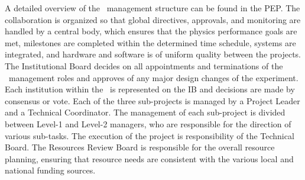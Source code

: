 A detailed overview of the \GADMC\ management structure can be found in the PEP. The collaboration is organized so that global directives, approvals, and monitoring are handled by a central body, which ensures that the physics performance goals are met, milestones are completed within the determined time schedule, systems are integrated, and hardware and software is of uniform quality between the projects. The Institutional Board decides on all appointments and terminations of the \GADMC\ management roles and approves of any major design changes of the experiment. Each institution within the \GADMC\ is represented on the IB and decisions are made by consensus or vote. Each of the three sub-projects is managed by a Project Leader and a Technical Coordinator. The management of each sub-project is divided between Level-1 and Level-2 managers, who are responsible for the direction of various sub-tasks. The execution of the project is responsibility of the Technical Board. The Resources Review Board is responsible for the overall resource planning, ensuring that resource needs are consistent with the various local and national funding sources.

%

